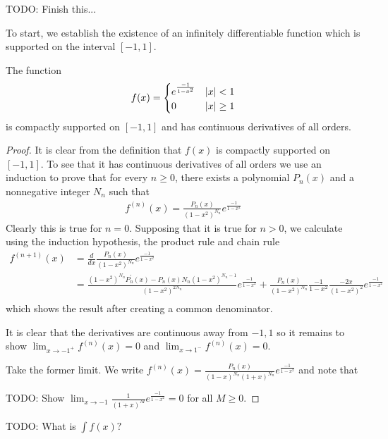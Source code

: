 TODO: Finish this...

To start, we establish the existence of an infinitely differentiable
function which is supported on the interval $[-1,1]$.

\begin{lem}\label{ExistenceOfBumpFunction}The function 
\begin{align*}
f(x) = \begin{cases}
e^\frac{-1}{1-x^2} & \left \vert x \right \vert < 1\\
0 & \left \vert x \right \vert \geq 1
\end{cases}
\end{align*} is compactly supported on $[-1,1]$ and has continuous
derivatives of all orders.
\end{lem}
\begin{proof}
It is clear from the definition that $f(x)$ is compactly supported on
$[-1,1]$.  To see that it has continuous derivatives of all orders we
use an induction to prove that for every $n\geq 0$, there exists a
polynomial $P_n(x)$ and a nonnegative integer $N_n$ such that 
\begin{align*}
f^{(n)}(x) = \frac{P_n(x)}{(1 - x^2)^{N_n}} e^\frac{-1}{1-x^2}
\end{align*}
Clearly this is true for $n=0$.  Supposing that it is true for $n >0$,
we calculate using the induction hypothesis, the product rule and
chain rule
\begin{align*}
f^{(n+1)}(x) &= \frac{d}{dx}\frac{P_n(x)}{(1 - x^2)^{N_n}}
e^\frac{-1}{1-x^2} \\
&= \frac{(1 - x^2)^{N_n} P_n^\prime(x) - P_n(x) N_n (1- x^2)^{N_n
    -1}}{(1 - x^2)^{2N_n}}e^\frac{-1}{1-x^2} + \frac{P_n(x)}{(1 - x^2)^{N_n}}\frac{-1}{1-x^2} \frac{-2x}{(1-x^2)^2}
e^\frac{-1}{1-x^2} \\
\end{align*}
which shows the result after creating a common denominator.

It is clear that the derivatives are continuous away from ${-1,1}$ so
it remains to show $\lim_{x \to -1^+} f^{(n)}(x) = 0$ and $\lim_{x \to
  1^-} f^{(n)}(x) = 0$.

Take the former limit.  We write $f^{(n)}(x) = \frac{P_n(x)}{(1 -
  x)^{N_n}(1 + x)^{N_n}} e^\frac{-1}{1-x^2}$ and note that


TODO: Show $\lim_{x \to -1} \frac{1}{(1 + x)^M} e^\frac{-1}{1-x^2} = 0$
for all $M \geq 0$.
\end{proof}

TODO: What is $\int f(x)?$

